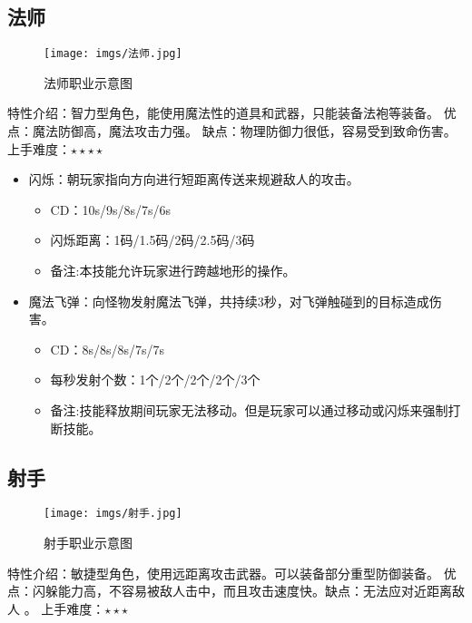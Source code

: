 \documentclass[UTF8,AutoFakeBold=1,AutoFakeSlant,zihao=-4]{cucthesis}
\begin{document}
\subsection{法师}

\begin{figure}[ht]
    \centering
    \texttt{[image: imgs/法师.jpg]}    
    \caption{法师职业示意图}
\end{figure}

特性介绍：智力型角色，能使用魔法性的道具和武器，只能装备法袍等装备。
优点：魔法防御高，魔法攻击力强。 缺点：物理防御力很低，容易受到致命伤害。
上手难度：$\star\star\star\star$


\begin{itemize}
    \item 闪烁：朝玩家指向方向进行短距离传送来规避敌人的攻击。
    \begin{itemize}
        \item CD：10s/9s/8s/7s/6s
        \item 闪烁距离：1码/1.5码/2码/2.5码/3码
        \item 备注:本技能允许玩家进行跨越地形的操作。
    \end{itemize}

    \item 魔法飞弹：向怪物发射魔法飞弹，共持续3秒，对飞弹触碰到的目标造成伤害。
    \begin{itemize}
        \item CD：8s/8s/8s/7s/7s
        \item 每秒发射个数：1个/2个/2个/2个/3个
        \item 备注:技能释放期间玩家无法移动。但是玩家可以通过移动或闪烁来强制打断技能。
    \end{itemize}
\end{itemize}


\subsection{射手}
\begin{figure}[ht]
    \centering
    \texttt{[image: imgs/射手.jpg]}    
    \caption{射手职业示意图}
\end{figure}

特性介绍：敏捷型角色，使用远距离攻击武器。可以装备部分重型防御装备。 
优点：闪躲能力高，不容易被敌人击中，而且攻击速度快。缺点：无法应对近距离敌人 。
上手难度：$\star\star\star$
\end{document}
